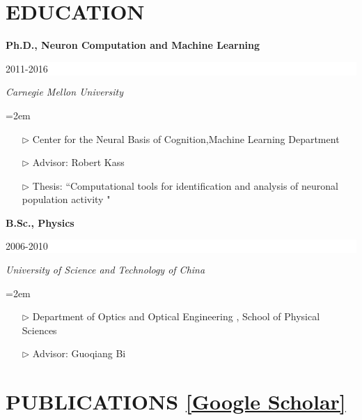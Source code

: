 \documentclass[paper=letter,fontsize=11pt]{scrartcl} %
\newcommand{\sepspace}{\vspace*{1em}}		%
\newcommand{\NewPart}[2]{\section*{\uppercase{#1} #2}}
\newcommand{\EducationEntry}[4]{
		\noindent \textbf{#1} \hfill      %
		\colorbox{White}{%
			\parbox{6em}{%
			\hfill\color{Black}#2}} \par  %
		\noindent \textit{#3} \par        %
		\noindent\hangindent=2em\hangafter=0 \small #4 %
		\normalsize \par}
\begin{document}
\NewPart{Education}{}

\EducationEntry{Ph.D., Neuron Computation and Machine Learning}{2011-2016}{Carnegie Mellon University}
{\begin{itemize}
\item[$\triangleright$]{Center for the Neural Basis of Cognition,Machine Learning Department}
\item[$\triangleright$]{Advisor: Robert Kass}
\item[$\triangleright$] Thesis: ``Computational tools for identification and analysis of neuronal population activity "
\end{itemize}}
\sepspace

\EducationEntry{B.Sc., Physics}{2006-2010}{University of Science and Technology of China}
{\begin{itemize}
\item[$\triangleright$] {Department of Optics and Optical Engineering
, School of Physical Sciences}
\item[$\triangleright$] {Advisor: Guoqiang Bi}
\end{itemize}}


\NewPart{Publications}{\href{http://scholar.google.com/citations?hl=en&user=hw0JvzAAAAAJ}{[Google Scholar]}}
\end{document}
